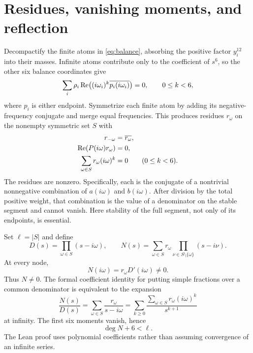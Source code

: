 \documentclass[11pt]{article}
\begin{document}
\section{Residues, vanishing moments, and reflection}
Decompactify the finite atoms in \eqref{eq:balance}, absorbing the positive factor $y_i^{12}$ into their masses. Infinite atoms contribute only to the coefficient of $s^6$, so the other six balance coordinates give
\begin{equation}\label{eq:realmoms}
 \sum_i\rho_i\operatorname{Re}\bigl((i\omega_i)^k\overline{p_i(i\omega_i)}\bigr)=0,
 \qquad 0\le k<6,
\end{equation}
where $p_i$ is either endpoint. Symmetrize each finite atom by adding its negative-frequency conjugate and merge equal frequencies. This produces residues $r_\omega$ on the nonempty symmetric set $S$ with
\begin{align}
 r_{-\omega}&=\overline{r_\omega},\label{eq:conj}\\
 \operatorname{Re}(P(i\omega)r_\omega)&=0,\label{eq:contact}\\
 \sum_{\omega\in S}r_\omega(i\omega)^k&=0\qquad(0\le k<6).\label{eq:moments}
\end{align}
The residues are nonzero. Specifically, each is the conjugate of a nontrivial nonnegative combination of $a(i\omega)$ and $b(i\omega)$. After division by the total positive weight, that combination is the value of a denominator on the stable segment and cannot vanish. Here stability of the full segment, not only of its endpoints, is essential.

Set $\ell=|S|$ and define
\begin{equation}\label{eq:DN}
 D(s)=\prod_{\omega\in S}(s-i\omega),\qquad
 N(s)=\sum_{\omega\in S}r_\omega
       \prod_{\nu\in S\setminus\{\omega\}}(s-i\nu).
\end{equation}
At every node,
\begin{equation}\label{eq:evalN}
 N(i\omega)=r_\omega D'(i\omega)\ne0.
\end{equation}
Thus $N\ne0$. The formal coefficient identity for putting simple fractions over a common denominator is equivalent to the expansion
\[
 \frac{N(s)}{D(s)}=\sum_{\omega\in S}\frac{r_\omega}{s-i\omega}
 =\sum_{k\ge0}\frac{\sum_{\omega\in S}r_\omega(i\omega)^k}{s^{k+1}}
\]
at infinity. The first six moments vanish, hence
\begin{equation}\label{eq:gap}
 \deg N+6<\ell.
\end{equation}
The Lean proof uses polynomial coefficients rather than assuming convergence of an infinite series.
\end{document}
